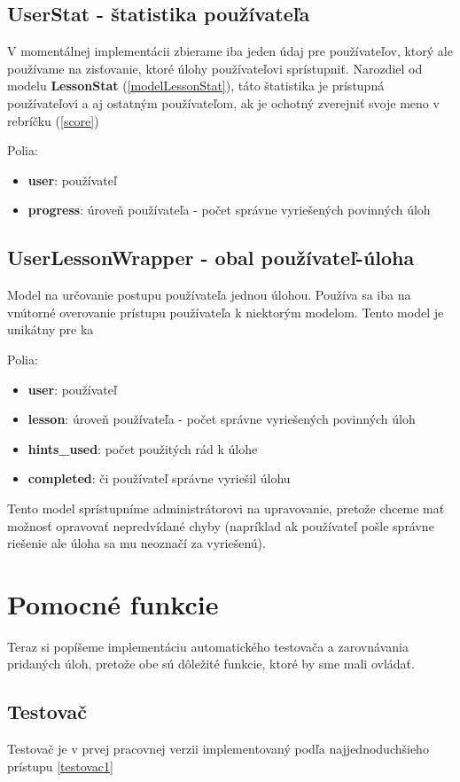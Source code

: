 \subsection{UserStat - štatistika používateľa}
\label{modelUserStat}
V momentálnej implementácii zbierame iba jeden údaj pre používateľov, ktorý ale používame
na zisťovanie, ktoré úlohy používateľovi sprístupniť. Narozdiel od modelu \textbf{LessonStat} (\ref{modelLessonStat}),
táto štatistika je prístupná používateľovi a aj ostatným používateľom, ak je ochotný zverejniť svoje
meno v rebríčku (\ref{score})

Polia:
\begin{itemize}
\item \textbf{user}: používateľ
\item \textbf{progress}: úroveň používateľa - počet správne vyriešených povinných úloh
\end{itemize}

\subsection{UserLessonWrapper - obal používateľ-úloha}
\label{modelWrapper}
Model na určovanie postupu používateľa jednou úlohou. Používa sa iba na vnútorné
overovanie prístupu používateľa k niektorým modelom. Tento model je unikátny pre ka



Polia:
\begin{itemize}
\item \textbf{user}: používateľ
\item \textbf{lesson}: úroveň používateľa - počet správne vyriešených povinných úloh
\item \textbf{hints\_used}: počet použitých rád k úlohe
\item \textbf{completed}: či používateľ správne vyriešil úlohu
\end{itemize}

Tento model sprístupníme administrátorovi na upravovanie, pretože chceme mať možnosť
opravovať nepredvídané chyby (napríklad ak používateľ pošle správne riešenie ale
úloha sa mu neoznačí za vyriešenú).

\protect\section{Pomocné funkcie}
Teraz si popíšeme implementáciu automatického testovača a zarovnávania pridaných úloh, pretože obe sú dôležité
funkcie, ktoré by sme mali ovládať.
\subsection{Testovač}
Testovač je v prvej pracovnej verzii implementovaný podľa najjednoduchšieho prístupu \ref{testovac1}

